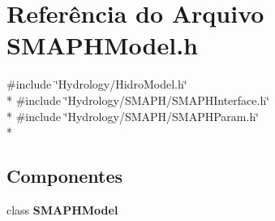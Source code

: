 \section{Referência do Arquivo S\+M\+A\+P\+H\+Model.\+h}
\label{_s_m_a_p_h_model_8h}
{\ttfamily \#include \char`\"{}Hydrology/\+Hidro\+Model.\+h\char`\"{}}\\*
{\ttfamily \#include \char`\"{}Hydrology/\+S\+M\+A\+P\+H/\+S\+M\+A\+P\+H\+Interface.\+h\char`\"{}}\\*
{\ttfamily \#include \char`\"{}Hydrology/\+S\+M\+A\+P\+H/\+S\+M\+A\+P\+H\+Param.\+h\char`\"{}}\\*
\subsection*{Componentes}
\begin{DoxyCompactItemize}
\item 
class {\bf S\+M\+A\+P\+H\+Model}
\end{DoxyCompactItemize}
